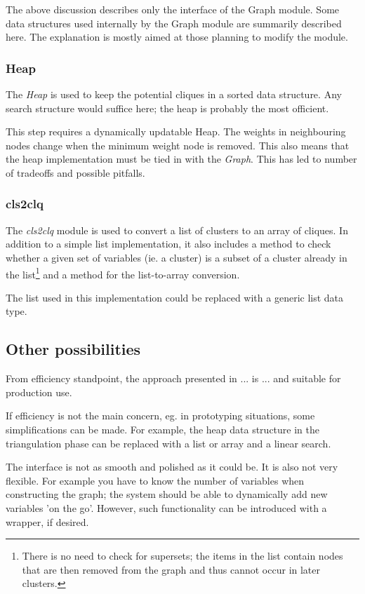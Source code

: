 \documentclass[12pt,a4paper]{report}
\newcommand{\cdatatype}[1]{{\it #1}}
\begin{document}
The above discussion describes only the interface of the Graph
module. Some data structures used internally by the Graph module are
summarily described here. The explanation is mostly aimed at those
planning to modify the module.

\subsubsection{Heap}

The \cdatatype{Heap} is used to keep the potential cliques in a sorted
data structure. Any search structure would suffice here; the heap is
probably the most officient.

This step requires a dynamically updatable Heap. The weights in
neighbouring nodes change when the minimum weight node is
removed. This also means that the heap implementation must be tied in
with the \cdatatype{Graph}. This has led to number of tradeoffs and
possible pitfalls.

\subsubsection{cls2clq}

The \cdatatype{cls2clq} module is used to convert a list of clusters
to an array of cliques. In addition to a simple list implementation,
it also includes a method to check whether a given set of variables
(ie. a cluster) is a subset of a cluster already in the
list\footnote{There is no need to check for supersets; the items in
the list contain nodes that are then removed from the graph and thus cannot
occur in later clusters.} and a method for the list-to-array
conversion.

The list used in this implementation could be replaced with a generic
list data type.


\subsection{Other possibilities}

From efficiency standpoint, the approach presented in ... is ... and
suitable for production use.

If efficiency is not the main concern, eg. in prototyping situations,
some simplifications can be made. For example, the heap data structure
in the triangulation phase can be replaced with a list or array and a linear
search.

The interface is not as smooth and polished as it could be. It is also
not very flexible. For example you have to know the number of
variables when constructing the graph; the system should be able to
dynamically add new variables 'on the go'. However, such functionality
can be introduced with a wrapper, if desired.
\end{document}
